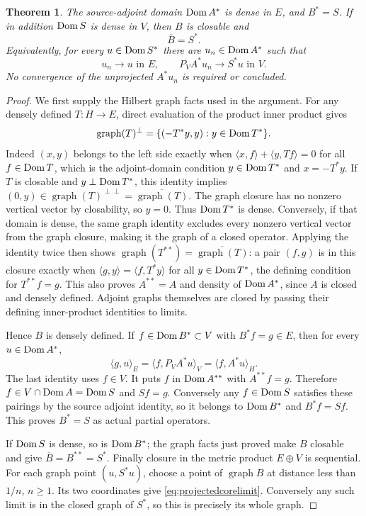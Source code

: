 \documentclass[11pt]{article}
\newtheorem{theorem}{Theorem}[section]
\begin{document}
\begin{theorem}\label{thm:observablecore}
The source-adjoint domain $\operatorname{Dom} A^*$ is dense in $E$, and
$B^*=S$. If in addition $\operatorname{Dom} S$ is dense in $V$, then $B$ is
closable and
\[
 \overline B=S^*.
\]
Equivalently, for every $u\in\operatorname{Dom} S^*$ there are
$u_n\in\operatorname{Dom} A^*$ such that
\begin{equation}\label{eq:projectedcorelimit}
 u_n\longrightarrow u\text{ in }E,\qquad
 P_VA^*u_n\longrightarrow S^*u\text{ in }V.
\end{equation}
No convergence of the unprojected $A^*u_n$ is required or concluded.
\end{theorem}
\begin{proof}
We first supply the Hilbert graph facts used in the argument.
For any densely defined $T:H\to E$, direct evaluation of the
product inner product gives
\[
 \operatorname{graph}(T)^\perp
   =\{(-T^*y,y):y\in\operatorname{Dom} T^*\}.
\]
Indeed $(x,y)$ belongs to the left side exactly when
$\langle x,f\rangle+\langle y,Tf\rangle=0$ for all
$f\in\operatorname{Dom} T$, which is the adjoint-domain condition
$y\in\operatorname{Dom} T^*$ and $x=-T^*y$.
If $T$ is closable and $y\perp\operatorname{Dom} T^*$, this identity implies
$(0,y)\in\operatorname{graph}(T)^{\perp\perp}
=\overline{\operatorname{graph}(T)}$. The graph closure has no
nonzero vertical vector by closability, so $y=0$. Thus $\operatorname{Dom} T^*$
is dense. Conversely, if that domain is dense, the same graph
identity excludes every nonzero vertical vector from the graph
closure, making it the graph of a closed operator. Applying the
identity twice then shows
$\operatorname{graph}(T^{**})=\overline{\operatorname{graph}(T)}$:
a pair $(f,g)$ is in this closure exactly when
$\langle g,y\rangle=\langle f,T^*y\rangle$ for all
$y\in\operatorname{Dom} T^*$, the defining condition for $T^{**}f=g$.
This also proves $A^{**}=A$ and density of $\operatorname{Dom} A^*$, since
$A$ is closed and densely defined. Adjoint graphs themselves are
closed by passing their defining inner-product identities to limits.

Hence $B$ is densely defined. If $f\in\operatorname{Dom} B^*\subset V$ with
$B^*f=g\in E$, then for every $u\in\operatorname{Dom} A^*$,
\[
 \langle g,u\rangle_E=\langle f,P_VA^*u\rangle_V
                       =\langle f,A^*u\rangle_H.
\]
The last identity uses $f\in V$. It puts $f$ in $\operatorname{Dom} A^{**}$
with $A^{**}f=g$. Therefore $f\in V\cap\operatorname{Dom} A=\operatorname{Dom} S$ and
$Sf=g$. Conversely any $f\in\operatorname{Dom} S$ satisfies these pairings
by the source adjoint identity, so it belongs to $\operatorname{Dom} B^*$ and
$B^*f=Sf$. This proves $B^*=S$ as actual partial operators.

If $\operatorname{Dom} S$ is dense, so is $\operatorname{Dom} B^*$; the graph facts just
proved make $B$ closable and give
$\overline B=B^{**}=S^*$. Finally closure in the metric product
$E\oplus V$ is sequential. For each graph point $(u,S^*u)$,
choose a point of $\operatorname{graph}B$ at distance less than
$1/n$, $n\geq1$. Its two coordinates give
\eqref{eq:projectedcorelimit}. Conversely any such limit is in the
closed graph of $S^*$, so this is precisely its whole graph.
\end{proof}
\end{document}
